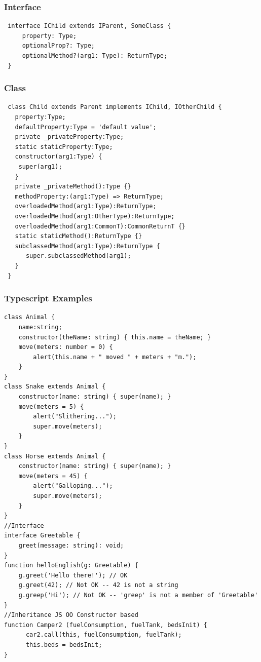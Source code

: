 \begin{multicols*}{4}
\subsubsection{Interface}
 \begin{verbatim}
 interface IChild extends IParent, SomeClass {
     property: Type;
     optionalProp?: Type;
     optionalMethod?(arg1: Type): ReturnType;
 }
 \end{verbatim}

\subsubsection{Class}
 \begin{verbatim}
 class Child extends Parent implements IChild, IOtherChild {
   property:Type;
   defaultProperty:Type = 'default value';      
   private _privateProperty:Type;      
   static staticProperty:Type;      
   constructor(arg1:Type) {      
    super(arg1);      
   }      
   private _privateMethod():Type {}      
   methodProperty:(arg1:Type) => ReturnType;      
   overloadedMethod(arg1:Type):ReturnType;      
   overloadedMethod(arg1:OtherType):ReturnType;      
   overloadedMethod(arg1:CommonT):CommonReturnT {}      
   static staticMethod():ReturnType {}      
   subclassedMethod(arg1:Type):ReturnType {      
      super.subclassedMethod(arg1);      
   }      
 } 
  \end{verbatim}
\subsubsection{Typescript Examples}
 \begin{verbatim}
class Animal {
    name:string;
    constructor(theName: string) { this.name = theName; }
    move(meters: number = 0) {
        alert(this.name + " moved " + meters + "m.");
    }
}
class Snake extends Animal {
    constructor(name: string) { super(name); }
    move(meters = 5) {
        alert("Slithering...");
        super.move(meters);
    }
}
class Horse extends Animal {
    constructor(name: string) { super(name); }
    move(meters = 45) {
        alert("Galloping...");
        super.move(meters);
    }
}
//Interface
interface Greetable {
    greet(message: string): void;
}
function helloEnglish(g: Greetable) {
    g.greet('Hello there!'); // OK
    g.greet(42); // Not OK -- 42 is not a string
    g.greep('Hi'); // Not OK -- 'greep' is not a member of 'Greetable'
}
//Inheritance JS OO Constructor based
function Camper2 (fuelConsumption, fuelTank, bedsInit) {
      car2.call(this, fuelConsumption, fuelTank);
      this.beds = bedsInit;
}

  \end{verbatim}
\end{multicols*}
